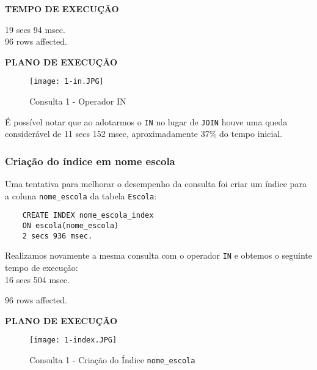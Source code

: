 \documentclass[12pt,a4paper]{article}
\begin{document}
\begin{flushleft}
\textbf{TEMPO DE EXECUÇÃO}\\
\end{flushleft}
19 secs 94 msec.\\
96 rows affected.\\

\pagebreak
\begin{flushleft}
\textbf{PLANO DE EXECUÇÃO}\\
\end{flushleft}

\begin{figure}[H]
    \centering
    \texttt{[image: 1-in.JPG]}
    \caption{Consulta 1 - Operador IN}
    \label{fig:diagrama}
\end{figure}

É possível notar que ao adotarmos o \texttt{IN} no lugar de \texttt{JOIN} houve uma queda considerável de 11 secs 152 msec, aproximadamente 37\% do tempo inicial. 
\subsubsection{Criação do índice em nome escola}

Uma tentativa para melhorar o desempenho da consulta foi criar um índice para a coluna \texttt{nome\_escola} da tabela \texttt{Escola}:

\begin{verbatim}
    CREATE INDEX nome_escola_index
    ON escola(nome_escola)
    2 secs 936 msec.
\end{verbatim}

Realizamos novamente a mesma consulta com o operador \texttt{IN} e obtemos o seguinte tempo de execução:\\

16 secs 504 msec.

96 rows affected.\\

\pagebreak
\begin{flushleft}
\textbf{PLANO DE EXECUÇÃO}\\
\end{flushleft}

\begin{figure}[H]
    \centering
    \texttt{[image: 1-index.JPG]}
    \caption{Consulta 1 - Criação do Índice \texttt{nome\_escola}}
    \label{fig:diagrama}
\end{figure}
\end{document}
